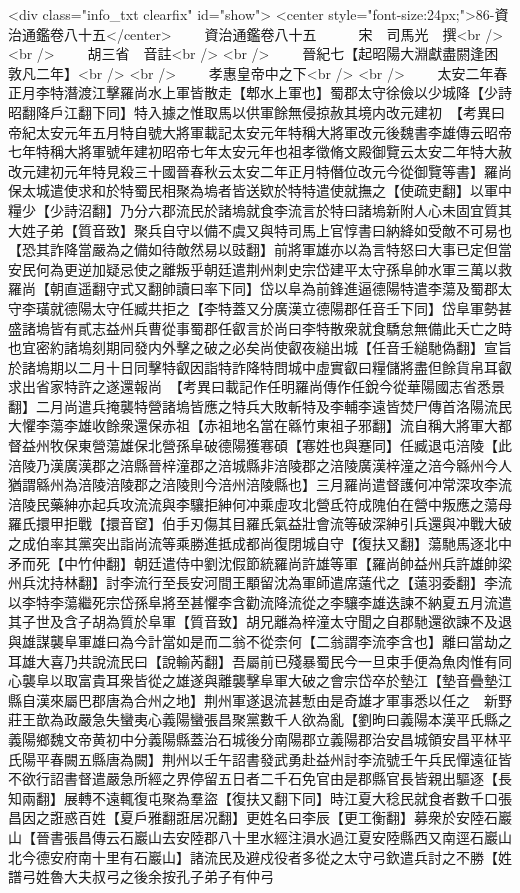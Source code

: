 <div class="info_txt clearfix" id="show">
<center style="font-size:24px;">86-資治通鑑卷八十五</center>
  　　資治通鑑卷八十五　　　宋　司馬光　撰<br />
<br />
　　胡三省　音註<br />
<br />
　　晉紀七【起昭陽大淵獻盡閼逢困敦凡二年】<br />
<br />
　　孝惠皇帝中之下<br />
<br />
　　太安二年春正月李特潛渡江擊羅尚水上軍皆散走【郫水上軍也】蜀郡太守徐儉以少城降【少詩昭翻降戶江翻下同】特入據之惟取馬以供軍餘無侵掠赦其境内改元建初　【考異曰帝紀太安元年五月特自號大將軍載記太安元年特稱大將軍改元後魏書李雄傳云昭帝七年特稱大將軍號年建初昭帝七年太安元年也祖孝徵脩文殿御覽云太安二年特大赦改元建初元年特見殺三十國晉春秋云太安二年正月特僭位改元今從御覽等書】羅尚保太城遣使求和於特蜀民相聚為塢者皆送欵於特特遣使就撫之【使疏吏翻】以軍中糧少【少詩沼翻】乃分六郡流民於諸塢就食李流言於特曰諸塢新附人心未固宜質其大姓子弟【質音致】聚兵自守以備不虞又與特司馬上官惇書曰納絳如受敵不可易也【恐其詐降當嚴為之備如待敵然易以豉翻】前將軍雄亦以為言特怒曰大事已定但當安民何為更逆加疑忌使之離叛乎朝廷遣荆州刺史宗岱建平太守孫阜帥水軍三萬以救羅尚【朝直遥翻守式又翻帥讀曰率下同】岱以阜為前鋒進逼德陽特遣李蕩及蜀郡太守李璜就德陽太守任臧共拒之【李特蓋又分廣漢立德陽郡任音壬下同】岱阜軍勢甚盛諸塢皆有貳志益州兵曹從事蜀郡任叡言於尚曰李特散衆就食驕怠無備此夭亡之時也宜密約諸塢刻期同發内外擊之破之必矣尚使叡夜縋出城【任音壬縋馳偽翻】宣旨於諸塢期以二月十日同擊特叡因詣特詐降特問城中虛實叡曰糧儲將盡但餘貨帛耳叡求出省家特許之遂還報尚　【考異曰載記作任明羅尚傳作任銳今從華陽國志省悉景翻】二月尚遣兵掩襲特營諸塢皆應之特兵大敗斬特及李輔李遠皆焚尸傳首洛陽流民大懼李蕩李雄收餘衆還保赤祖【赤祖地名當在緜竹東祖子邪翻】流自稱大將軍大都督益州牧保東營蕩雄保北營孫阜破德陽獲寋碩【寋姓也與蹇同】任臧退屯涪陵【此涪陵乃漢廣漢郡之涪縣晉梓潼郡之涪城縣非涪陵郡之涪陵廣漢梓潼之涪今緜州今人猶謂緜州為涪陵涪陵郡之涪陵則今涪州涪陵縣也】三月羅尚遣督護何冲常深攻李流涪陵民藥紳亦起兵攻流流與李驤拒紳何冲乘虛攻北營氐符成隗伯在營中叛應之蕩母羅氏擐甲拒戰【擐音䆠】伯手刃傷其目羅氏氣益壯會流等破深紳引兵還與冲戰大破之成伯率其黨突出詣尚流等乘勝進抵成都尚復閉城自守【復扶又翻】蕩馳馬逐北中矛而死【中竹仲翻】朝廷遣侍中劉沈假節統羅尚許雄等軍【羅尚帥益州兵許雄帥梁州兵沈持林翻】討李流行至長安河間王顒留沈為軍師遣席薳代之【薳羽委翻】李流以李特李蕩繼死宗岱孫阜將至甚懼李含勸流降流從之李驤李雄迭諫不納夏五月流遣其子世及含子胡為質於阜軍【質音致】胡兄離為梓潼太守聞之自郡馳還欲諫不及退與雄謀襲阜軍雄曰為今計當如是而二翁不從柰何【二翁謂李流李含也】離曰當劫之耳雄大喜乃共說流民曰【說輸芮翻】吾屬前已殘暴蜀民今一旦束手便為魚肉惟有同心襲阜以取富貴耳衆皆從之雄遂與離襲擊阜軍大破之會宗岱卒於墊江【墊音疊墊江縣自漢來屬巴郡唐為合州之地】荆州軍遂退流甚慙由是奇雄才軍事悉以任之　新野莊王歆為政嚴急失蠻夷心義陽蠻張昌聚黨數千人欲為亂【劉昫曰義陽本漢平氏縣之義陽鄉魏文帝黄初中分義陽縣蓋治石城後分南陽郡立義陽郡治安昌城領安昌平林平氏陽平春闕五縣唐為闕】荆州以壬午詔書發武勇赴益州討李流號壬午兵民憚遠征皆不欲行詔書督遣嚴急所經之界停留五日者二千石免官由是郡縣官長皆親出驅逐【長知兩翻】展轉不遠輒復屯聚為羣盜【復扶又翻下同】時江夏大稔民就食者數千口張昌因之誑惑百姓【夏戶雅翻誑居况翻】更姓名曰李辰【更工衡翻】募衆於安陸石巖山【晉書張昌傳云石巖山去安陸郡八十里水經注溳水過江夏安陸縣西又南逕石巖山北今德安府南十里有石巖山】諸流民及避戍役者多從之太守弓欽遣兵討之不勝【姓譜弓姓魯大夫叔弓之後余按孔子弟子有仲弓